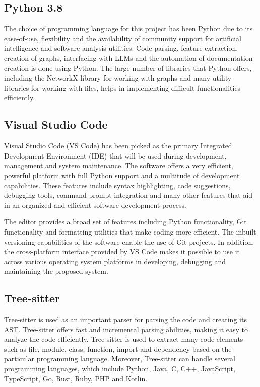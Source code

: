 \subsection{Python 3.8}
\hspace{0.5cm}
The choice of programming language for this project has been Python due to its ease-of-use, flexibility and the availability of community support for artificial intelligence and software analysis utilities. Code parsing, feature extraction, creation of graphs, interfacing with LLMs and the automation of documentation creation is done using Python. The large number of libraries that Python offers, including the NetworkX library for working with graphs and many utility libraries for working with files, helps in implementing difficult functionalities efficiently.


\subsection{Visual Studio Code}
\hspace{0.5cm}Visual Studio Code (VS Code) has been picked as the primary Integrated Development Environment (IDE) that will be used during development, management and system maintenance. The software offers a very efficient, powerful platform with full Python support and a multitude of development capabilities. These features include syntax highlighting, code suggestions, debugging tools, command prompt integration and many other features that aid in an organized and efficient software development process. 

\par The editor provides a broad set of features including Python functionality, Git functionality and formatting utilities that make coding more efficient. The inbuilt versioning capabilities of the software enable the use of Git projects. In addition, the cross-platform interface provided by VS Code makes it possible to use it across various operating system platforms in developing, debugging and maintaining the proposed system.

\subsection{Tree-sitter}
\hspace{0.5cm}
Tree-sitter is used as an important parser for parsing the code and creating its AST. Tree-sitter offers fast and incremental parsing abilities, making it easy to analyze the code efficiently. Tree-sitter is used to extract many code elements such as file, module, class, function, import and dependency based on the particular programming language. Moreover, Tree-sitter can handle several programming languages, which include Python, Java, C, C++, JavaScript, TypeScript, Go, Rust, Ruby, PHP and Kotlin.

